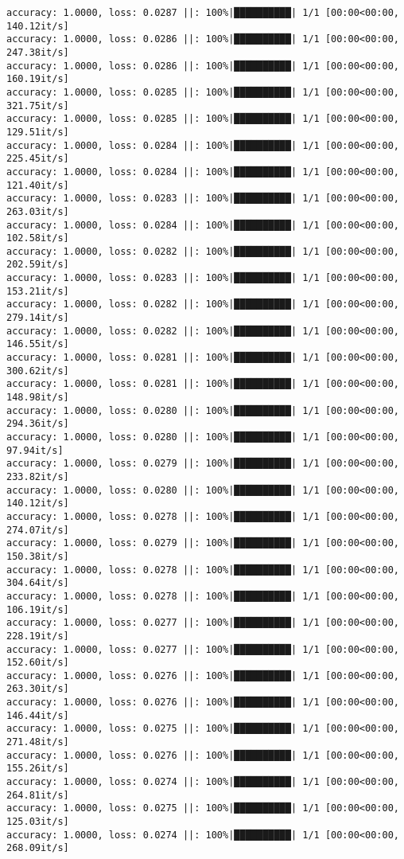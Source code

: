 \documentclass[
]{article}
\begin{document}
\begin{verbatim}
accuracy: 1.0000, loss: 0.0287 ||: 100%|██████████| 1/1 [00:00<00:00, 140.12it/s]
accuracy: 1.0000, loss: 0.0286 ||: 100%|██████████| 1/1 [00:00<00:00, 247.38it/s]
accuracy: 1.0000, loss: 0.0286 ||: 100%|██████████| 1/1 [00:00<00:00, 160.19it/s]
accuracy: 1.0000, loss: 0.0285 ||: 100%|██████████| 1/1 [00:00<00:00, 321.75it/s]
accuracy: 1.0000, loss: 0.0285 ||: 100%|██████████| 1/1 [00:00<00:00, 129.51it/s]
accuracy: 1.0000, loss: 0.0284 ||: 100%|██████████| 1/1 [00:00<00:00, 225.45it/s]
accuracy: 1.0000, loss: 0.0284 ||: 100%|██████████| 1/1 [00:00<00:00, 121.40it/s]
accuracy: 1.0000, loss: 0.0283 ||: 100%|██████████| 1/1 [00:00<00:00, 263.03it/s]
accuracy: 1.0000, loss: 0.0284 ||: 100%|██████████| 1/1 [00:00<00:00, 102.58it/s]
accuracy: 1.0000, loss: 0.0282 ||: 100%|██████████| 1/1 [00:00<00:00, 202.59it/s]
accuracy: 1.0000, loss: 0.0283 ||: 100%|██████████| 1/1 [00:00<00:00, 153.21it/s]
accuracy: 1.0000, loss: 0.0282 ||: 100%|██████████| 1/1 [00:00<00:00, 279.14it/s]
accuracy: 1.0000, loss: 0.0282 ||: 100%|██████████| 1/1 [00:00<00:00, 146.55it/s]
accuracy: 1.0000, loss: 0.0281 ||: 100%|██████████| 1/1 [00:00<00:00, 300.62it/s]
accuracy: 1.0000, loss: 0.0281 ||: 100%|██████████| 1/1 [00:00<00:00, 148.98it/s]
accuracy: 1.0000, loss: 0.0280 ||: 100%|██████████| 1/1 [00:00<00:00, 294.36it/s]
accuracy: 1.0000, loss: 0.0280 ||: 100%|██████████| 1/1 [00:00<00:00, 97.94it/s]
accuracy: 1.0000, loss: 0.0279 ||: 100%|██████████| 1/1 [00:00<00:00, 233.82it/s]
accuracy: 1.0000, loss: 0.0280 ||: 100%|██████████| 1/1 [00:00<00:00, 140.12it/s]
accuracy: 1.0000, loss: 0.0278 ||: 100%|██████████| 1/1 [00:00<00:00, 274.07it/s]
accuracy: 1.0000, loss: 0.0279 ||: 100%|██████████| 1/1 [00:00<00:00, 150.38it/s]
accuracy: 1.0000, loss: 0.0278 ||: 100%|██████████| 1/1 [00:00<00:00, 304.64it/s]
accuracy: 1.0000, loss: 0.0278 ||: 100%|██████████| 1/1 [00:00<00:00, 106.19it/s]
accuracy: 1.0000, loss: 0.0277 ||: 100%|██████████| 1/1 [00:00<00:00, 228.19it/s]
accuracy: 1.0000, loss: 0.0277 ||: 100%|██████████| 1/1 [00:00<00:00, 152.60it/s]
accuracy: 1.0000, loss: 0.0276 ||: 100%|██████████| 1/1 [00:00<00:00, 263.30it/s]
accuracy: 1.0000, loss: 0.0276 ||: 100%|██████████| 1/1 [00:00<00:00, 146.44it/s]
accuracy: 1.0000, loss: 0.0275 ||: 100%|██████████| 1/1 [00:00<00:00, 271.48it/s]
accuracy: 1.0000, loss: 0.0276 ||: 100%|██████████| 1/1 [00:00<00:00, 155.26it/s]
accuracy: 1.0000, loss: 0.0274 ||: 100%|██████████| 1/1 [00:00<00:00, 264.81it/s]
accuracy: 1.0000, loss: 0.0275 ||: 100%|██████████| 1/1 [00:00<00:00, 125.03it/s]
accuracy: 1.0000, loss: 0.0274 ||: 100%|██████████| 1/1 [00:00<00:00, 268.09it/s]

\end{verbatim}
\end{document}
